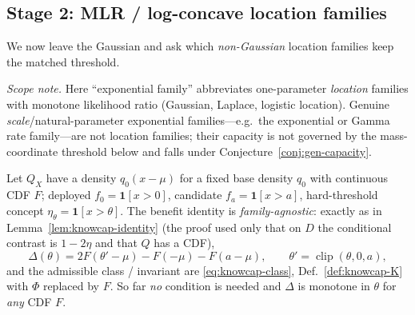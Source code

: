\subsection{Stage 2: MLR / log-concave location families}\label{sec:gen-mlr}
We now leave the Gaussian and ask which \emph{non-Gaussian} location families keep
the matched threshold.

\emph{Scope note.} Here ``exponential family'' abbreviates one-parameter \emph{location}
families with monotone likelihood ratio (Gaussian, Laplace, logistic location). Genuine
\emph{scale}/natural-parameter exponential families---e.g.\ the exponential or Gamma rate
family---are not location families; their capacity is not governed by the mass-coordinate
threshold below and falls under Conjecture~\ref{conj:gen-capacity}.

Let $Q_X$ have a density $q_0(x-\mu)$ for a fixed base density
$q_0$ with continuous CDF $F$; deployed $f_0=\mathbf 1[x>0]$, candidate
$f_a=\mathbf 1[x>a]$, hard-threshold concept $\eta_\theta=\mathbf 1[x>\theta]$. The
benefit identity is \emph{family-agnostic}: exactly as in
Lemma~\ref{lem:knowcap-identity} (the proof used only that on $D$ the conditional
contrast is $1-2\eta$ and that $Q$ has a CDF),
\begin{equation}\label{eq:gen-fam-delta}
  \Delta(\theta)=2F(\theta'-\mu)-F(-\mu)-F(a-\mu),\qquad\theta'=\operatorname{clip}(\theta,0,a),
\end{equation}
and the admissible class / invariant are \eqref{eq:knowcap-class},
Def.~\ref{def:knowcap-K} with $\Phi$ replaced by $F$. So far \emph{no} condition is
needed and $\Delta$ is monotone in $\theta$ for \emph{any} CDF $F$.

